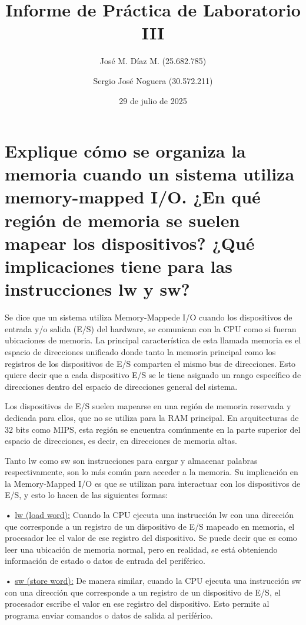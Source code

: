 \documentclass{article}
\title{Informe de Práctica de Laboratorio III}
\author{José M. Díaz M. (25.682.785) \and Sergio José Noguera (30.572.211)}
\date{29 de julio de 2025}
\begin{document}
\maketitle



\section{Explique cómo se organiza la memoria cuando un sistema utiliza memory-mapped I/O. ¿En qué región de memoria se suelen mapear los dispositivos? ¿Qué implicaciones tiene para las instrucciones lw y sw?}


\quad

{Se dice que un sistema utiliza Memory-Mappede I/O cuando los dispositivos de entrada y/o salida (E/S) del hardware, se comunican con la CPU como si fueran ubicaciones de memoria. La principal característica de esta llamada memoria es el espacio de direcciones unificado donde tanto la memoria principal como los registros de los dispositivos de E/S comparten el mismo bus de direcciones. Esto quiere decir que a cada dispositivo E/S se le tiene asignado un rango específico de direcciones dentro del espacio de direcciones general del sistema.}

\quad

{Los dispositivos de E/S suelen mapearse en una región de memoria reservada y dedicada para ellos, que no se utiliza para la RAM principal. En arquitecturas de 32 bits como MIPS, esta región se encuentra comúnmente en la parte superior del espacio de direcciones, es decir, en direcciones de memoria altas.}

\quad

{Tanto lw como sw son instrucciones para cargar y almacenar palabras respectivamente, son lo más común para acceder a la memoria. Su implicación en la Memory-Mapped I/O es que se utilizan para interactuar con los dispositivos de E/S, y esto lo hacen de las siguientes formas:}

\quad

\textbf{•   } \underline{lw (load word):} { Cuando la CPU ejecuta una instrucción lw con una dirección que corresponde a un registro de un dispositivo de E/S mapeado en memoria, el procesador lee el valor de ese registro del dispositivo. Se puede decir que es como leer una ubicación de memoria normal, pero en realidad, se está obteniendo información de estado o datos de entrada del periférico.}

\quad

\textbf{•   } \underline{sw (store word):}{ De manera similar, cuando la CPU ejecuta una instrucción sw con una dirección que corresponde a un registro de un dispositivo de E/S, el procesador escribe el valor en ese registro del dispositivo. Esto permite al programa enviar comandos o datos de salida al periférico.}
\end{document}
